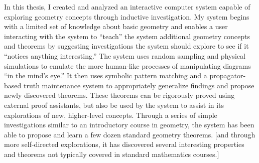 %
%
%
In this thesis, I created and analyzed an interactive computer system
capable of exploring geometry concepts through inductive
investigation.  My system begins with a limited set of knowledge about
basic geometry and enables a user interacting with the system to
``teach'' the system additional geometry concepts and theorems by
suggesting investigations the system should explore to see if it
``notices anything interesting.''  The system uses random sampling and
physical simulations to emulate the more human-like processes of
manipulating diagrams ``in the mind's eye.'' It then uses symbolic
pattern matching and a propagator-based truth maintenance system to
appropriately generalize findings and propose newly discovered
theorems. These theorems can be rigorously proved using external proof
assistants, but also be used by the system to assist in its
explorations of new, higher-level concepts. Through a series of simple
investigations similar to an introductory course in geometry, the
system has been able to propose and learn a few dozen standard
geometry theorems. [and through more self-directed explorations, it has
discovered several interesting properties and theorems not typically
covered in standard mathematics courses.]
